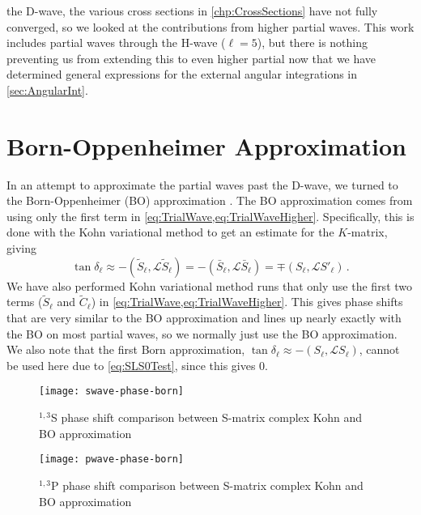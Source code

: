 \documentclass[Dissertation.tex]{subfiles}
\begin{document}
\iftoggle{UNT}{By}{\lettrine{\textcolor{startcolor}{B}}{y}}
the D-wave, the various cross sections in \cref{chp:CrossSections} have not
fully converged, so we looked at the contributions from higher partial waves.
This work includes partial waves through the H-wave ($\ell = 5$), but
there is nothing preventing us from extending this to even higher partial 
now that we have determined general expressions for the 
external angular integrations in \cref{sec:AngularInt}.


\section{Born-Oppenheimer Approximation}
\label{sec:Born}
In an attempt to approximate the partial waves past the D-wave, we turned to 
the Born-Oppenheimer (BO) approximation \cite{Massey1954,Oppenheimer1928,Geltman1969,Mott1965}.
The BO approximation comes from using only the 
first term in \cref{eq:TrialWave,eq:TrialWaveHigher}. Specifically, this is 
done with the Kohn variational method to get an estimate for the $K$-matrix, 
giving \cite[p.720]{Bransden2003}
\begin{equation}
\label{eq:Born}
\tan\delta_\ell \approx -(\widetilde{S}_\ell,\mathcal{L}\widetilde{S}_\ell ) = -(\bar{S}_\ell,\mathcal{L}\bar{S}_\ell ) = \mp(S_\ell,\mathcal{L}S'_\ell ) \,.
\end{equation}
We have also performed Kohn variational method runs that only use the first two 
terms ($\widetilde{S}_\ell$ and $\widetilde{C}_\ell$) in \cref{eq:TrialWave,eq:TrialWaveHigher}.
This gives phase shifts that are very similar to the BO approximation and lines up
nearly exactly with the BO on most partial waves, so we normally just use the BO
approximation. We also note that the first Born approximation,
$\tan\delta_\ell \approx -(S_\ell,\mathcal{L}S_\ell )$, cannot be used
here due to \cref{eq:SLS0Test}, since this gives 0.

\begin{figure}
	\centering
	\texttt{[image: swave-phase-born]}
	\caption[$^{1,3}$S complex Kohn and BO comparison]{$^{1,3}$S phase shift comparison between S-matrix complex Kohn and BO approximation}
	\label{fig:SWavePhaseBorn}
\end{figure}

\begin{figure}
	\centering
	\texttt{[image: pwave-phase-born]}
	\caption[$^{1,3}$P complex Kohn and BO comparison]{$^{1,3}$P phase shift comparison between S-matrix complex Kohn and BO approximation}
	\label{fig:PWavePhaseBorn}
\end{figure}
\end{document}
